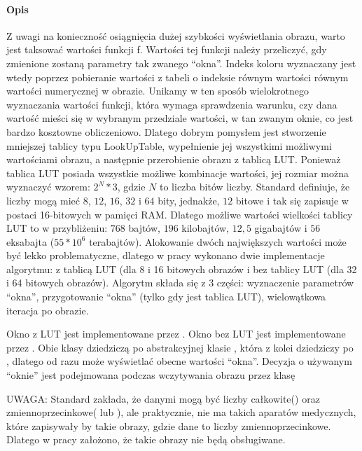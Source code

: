 \paragraph{Opis}
\par
Z uwagi na konieczność osiągnięcia dużej szybkości wyświetlania obrazu, warto jest taksować wartości funkcji f.
Wartości tej funkcji należy przeliczyć, gdy zmienione zostaną parametry tak zwanego \enquote{okna}.
Indeks koloru wyznaczany jest wtedy poprzez pobieranie wartości z tabeli o indeksie równym wartości równym wartości numerycznej w obrazie.
Unikamy w ten sposób wielokrotnego wyznaczania wartości funkcji, która wymaga sprawdzenia warunku, czy dana wartość mieści się w wybranym przedziale wartości, w tan zwanym oknie, co jest bardzo kosztowne obliczeniowo.
Dlatego dobrym pomysłem jest stworzenie mniejszej tablicy typu LookUpTable, wypełnienie jej wszystkimi możliwymi wartościami obrazu, a następnie przerobienie obrazu z tablicą LUT.
Ponieważ tablica LUT posiada wszystkie możliwe kombinacje wartości, jej rozmiar można wyznaczyć wzorem: $2^N*3$, gdzie $N$ to liczba bitów liczby.
Standard \DICOM definiuje, że liczby mogą mieć $8$, $12$, $16$, $32$ i $64$ bity, jednakże, $12$ bitowe i tak się zapisuje w postaci 16-bitowych w pamięci RAM.
Dlatego możliwe wartości wielkości tablicy LUT to w przybliżeniu: $768$ bajtów, $196$ kilobajtów, $12,5$ gigabajtów i $56$ eksabajta ($55*10^{6}$ terabajtów).
Alokowanie dwóch największych wartości może być lekko problematyczne, dlatego w pracy wykonano dwie implementacje algorytmu: z tablicą LUT (dla 8 i 16 bitowych obrazów i bez tablicy LUT (dla 32 i 64 bitowych obrazów).
Algorytm składa się z 3 części: wyznaczenie parametrów \enquote{okna}, przygotowanie \enquote{okna} (tylko gdy jest tablica LUT), wielowątkowa iteracja po obrazie.
\par
Okno z LUT jest implementowane przez .
Okno bez LUT jest implementowane przez .
Obie klasy dziedziczą po abstrakcyjnej klasie , która z kolei dziedziczy po , dlatego od razu może wyświetlać obecne wartości \enquote{okna}.
Decyzja o używanym \enquote{oknie} jest podejmowana podczas wczytywania obrazu przez klasę 
\par
UWAGA: Standard \DICOM zakłada, że danymi mogą być liczby całkowite() oraz zmiennoprzecinkowe( lub ), ale praktycznie, nie ma takich aparatów medycznych, które zapisywały by takie obrazy, gdzie dane to liczby zmiennoprzecinkowe.
Dlatego w pracy założono, że takie obrazy nie będą obsługiwane.

